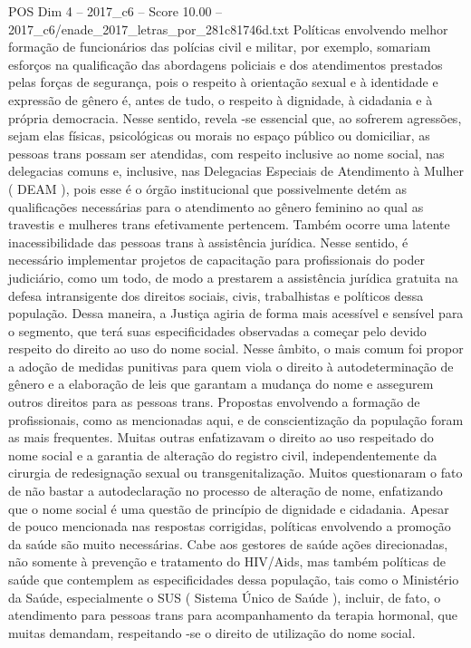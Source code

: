 \begin{textsample}{POS Dim 4 – 2017\_c6 – Score 10.00 – 2017\_c6/enade\_2017\_letras\_por\_281c81746d.txt}
Políticas envolvendo melhor formação de funcionários das polícias civil e militar, por exemplo, somariam esforços na qualificação das abordagens policiais e dos atendimentos prestados pelas forças de segurança, pois o respeito à orientação sexual e à identidade e expressão de gênero é, antes de tudo, o respeito à dignidade, à cidadania e à própria democracia.
Nesse sentido, revela -se essencial que, ao sofrerem agressões, sejam elas físicas, psicológicas ou morais no espaço público ou domiciliar, as pessoas trans possam ser atendidas, com respeito inclusive ao nome social, nas delegacias comuns e, inclusive, nas Delegacias Especiais de Atendimento à Mulher ( DEAM ), pois esse é o órgão institucional que possivelmente detém as qualificações necessárias para o atendimento ao gênero feminino ao qual as travestis e mulheres trans efetivamente pertencem.
Também ocorre uma latente inacessibilidade das pessoas trans à assistência jurídica.
Nesse sentido, é necessário implementar projetos de capacitação para profissionais do poder judiciário, como um todo, de modo a prestarem a assistência jurídica gratuita na defesa intransigente dos direitos sociais, civis, trabalhistas e políticos dessa população.
Dessa maneira, a Justiça agiria de forma mais acessível e sensível para o segmento, que terá suas especificidades observadas a começar pelo devido respeito do direito ao uso do nome social.
Nesse âmbito, o mais comum foi propor a adoção de medidas punitivas para quem viola o direito à autodeterminação de gênero e a elaboração de leis que garantam a mudança do nome e assegurem outros direitos para as pessoas trans.
Propostas envolvendo a formação de profissionais, como as mencionadas aqui, e de conscientização da população foram as mais frequentes.
Muitas outras enfatizavam o direito ao uso respeitado do nome social e a garantia de alteração do registro civil, independentemente da cirurgia de redesignação sexual ou transgenitalização.
Muitos questionaram o fato de não bastar a autodeclaração no processo de alteração de nome, enfatizando que o nome social é uma questão de princípio de dignidade e cidadania.
Apesar de pouco mencionada nas respostas corrigidas, políticas envolvendo a promoção da saúde são muito necessárias.
Cabe aos gestores de saúde ações direcionadas, não somente à prevenção e tratamento do HIV/Aids, mas também políticas de saúde que contemplem as especificidades dessa população, tais como o Ministério da Saúde, especialmente o SUS ( Sistema Único de Saúde ), incluir, de fato, o atendimento para pessoas trans para acompanhamento da terapia hormonal, que muitas demandam, respeitando -se o direito de utilização do nome social.

\end{textsample}
